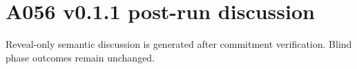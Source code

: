 \section*{A056 v0.1.1 post-run discussion}
Reveal-only semantic discussion is generated after commitment verification. Blind phase outcomes remain unchanged.
